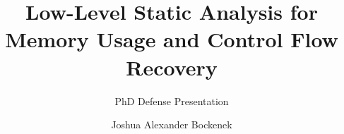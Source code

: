 \title[Memory Usage and Control Flow Recovery]{Low-Level Static Analysis for Memory Usage and Control Flow Recovery}
\subtitle{PhD Defense Presentation}
\author{Joshua Alexander Bockenek}
\subject{Static Binary Analysis}
\date{}
